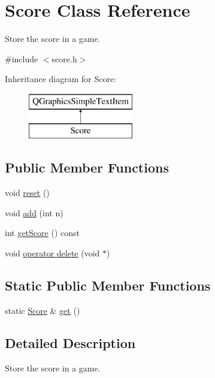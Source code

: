 \hypertarget{classScore}{\section{Score Class Reference}
\label{classScore}
}


Store the score in a game.  




{\ttfamily \#include $<$score.\-h$>$}

Inheritance diagram for Score\-:\begin{figure}[H]
\begin{center}
\leavevmode
\includegraphics[height=2.000000cm]{classScore}
\end{center}
\end{figure}
\subsection*{Public Member Functions}
\begin{DoxyCompactItemize}
\item 
void \hyperlink{classScore_a32804ba9a847e58160e6e0cef46e1f25}{reset} ()
\item 
void \hyperlink{classScore_a3200804353edce251558f3a7ec40a195}{add} (int n)
\item 
int \hyperlink{classScore_a41b9a02dabc787db4d96021cf7b8b442}{get\-Score} () const 
\item 
void \hyperlink{classScore_ad4ffb432a3313d65f29b5448e61b6d50}{operator delete} (void $\ast$)
\end{DoxyCompactItemize}
\subsection*{Static Public Member Functions}
\begin{DoxyCompactItemize}
\item 
static \hyperlink{classScore}{Score} \& \hyperlink{classScore_a57963d0e399308580bd08c15f7ef52a2}{get} ()
\end{DoxyCompactItemize}


\subsection{Detailed Description}
Store the score in a game. 

